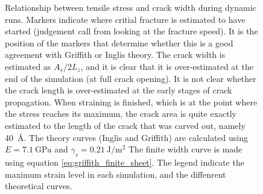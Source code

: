 \begin{figure}
\caption{Relationship between tensile stress and crack width during dynamic runs. Markers indicate where critial fracture is estimated to have started (judgement call from looking at the fracture speed). It is the position of the markers that determine whether this is a good agreement with Griffith or Inglis theory. The crack width is estimated as $A_s/2L_z$, and it is clear that it is over-estimated at the end of the simulation (at full crack opening). It is not clear whether the crack length is over-estimated at the early stages of crack propagation. When straining is finished, which is at the point where the stress reaches its maximum, the crack area is quite exactly estimated to the length of the crack that was carved out, namely \SI{40}{\angstrom}. The theory curves (Inglis and Griffith) are calculated using $E=\SI{7.1}{\giga\pascal}$ and $\gamma_s = \SI{0.21}{\joule\per\meter\squared}$ The finite width curve is made using equation \ref{eq:griffith_finite_sheet}. The legend indicate the maximum strain level in each simulation, and the diffenrent theoretical curves.}
\label{fig:fracture_theory_compare}
\end{figure}